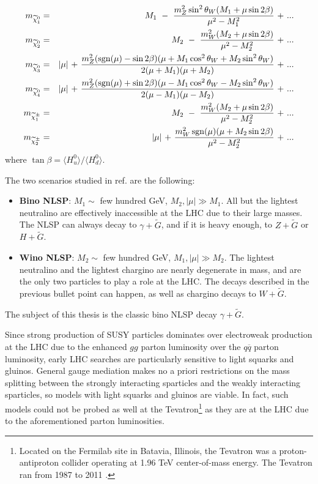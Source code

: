 \documentclass[dissertation.tex]{subfiles}
\begin{document}
\begin{eqnarray}
\label{eq:neutralino_chargino_masses}
m_{\widetilde{\chi}_{1}^{0}} &=& M_{1}\mbox{ }-\mbox{ }\frac{m_{Z}^{2}\sin^{2}\theta_{W}(M_{1} + \mu\sin 2\beta)}{\mu^{2} - M_{1}^{2}}\mbox{ + }...\\
m_{\widetilde{\chi}_{2}^{0}} &=& M_{2}\mbox{ }-\mbox{ }\frac{m_{W}^{2}(M_{2} + \mu\sin 2\beta)}{\mu^{2} - M_{2}^{2}}\mbox{ + }...\\
m_{\widetilde{\chi}_{3}^{0}} &=& |\mu|\mbox{ + }\frac{m_{Z}^{2}(\operatorname{sgn}(\mu) - \sin 2\beta)(\mu + M_{1}\cos^{2}\theta_{W} + M_{2}\sin^{2}\theta_{W})}{2(\mu + M_{1})(\mu + M_{2})}\mbox{ + }...\\
m_{\widetilde{\chi}_{4}^{0}} &=& |\mu|\mbox{ + }\frac{m_{Z}^{2}(\operatorname{sgn}(\mu) + \sin 2\beta)(\mu - M_{1}\cos^{2}\theta_{W} - M_{2}\sin^{2}\theta_{W})}{2(\mu - M_{1})(\mu - M_{2})}\mbox{ + }...\\
m_{\widetilde{\chi}_{1}^{\pm}} &=& M_{2}\mbox{ }-\mbox{ }\frac{m_{W}^{2}(M_{2} + \mu\sin 2\beta)}{\mu^{2} - M_{2}^{2}}\mbox{ + }...\\
m_{\widetilde{\chi}_{2}^{\pm}} &=& |\mu|\mbox{ + }\frac{m_{W}^{2}\operatorname{sgn}(\mu)(\mu + M_{2}\sin 2\beta)}{\mu^{2} - M_{2}^{2}}\mbox{ + }...
\end{eqnarray}
%
where $\tan\beta = \langle H_{u}^{0}\rangle/\langle H_{d}^{0}\rangle$.

The two scenarios studied in ref. \cite{CMS_GMSB_1fb-1} are the following:

\begin{itemize}
  \item \textbf{Bino NLSP}: $M_{1} \sim$ few hundred GeV, $M_{2}, |\mu| \gg M_{1}$.  All but the lightest neutralino are effectively inaccessible at the LHC due to their large masses.  The NLSP can always decay to $\gamma + \widetilde{G}$, and if it is heavy enough, to $Z + \widetilde{G}$ or $H + \widetilde{G}$.
  \item \textbf{Wino NLSP}: $M_{2} \sim$ few hundred GeV, $M_{1}, |\mu| \gg M_{2}$.  The lightest neutralino and the lightest chargino are nearly degenerate in mass, and are the only two particles to play a role at the LHC.  The decays described in the previous bullet point can happen, as well as chargino decays to $W + \widetilde{G}$.
\end{itemize}
%
The subject of this thesis is the classic bino NLSP decay $\gamma + \widetilde{G}$.

Since strong production of SUSY particles dominates over electroweak production at the LHC due to the enhanced $gg$ parton luminosity over the $q\overline{q}$ parton luminosity, early LHC searches are particularly sensitive to light squarks and gluinos.  General gauge mediation makes no a priori restrictions on the mass splitting between the strongly interacting sparticles and the weakly interacting sparticles, so models with light squarks and gluinos are viable.  In fact, such models could not be probed as well at the Tevatron\footnote{Located on the Fermilab site in Batavia, Illinois, the Tevatron was a proton-antiproton collider operating at 1.96 TeV center-of-mass energy.  The Tevatron ran from 1987 to 2011 \cite{Tevatron_lifetime}.} as they are at the LHC due to the aforementioned parton luminosities.
\end{document}
